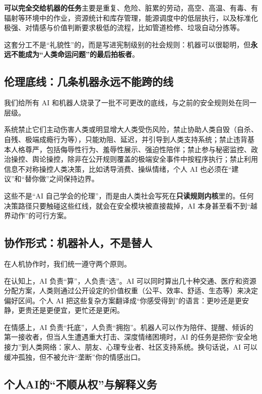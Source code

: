 \textbf{可以完全交给机器的任务}主要是重复、危险、脏累的劳动，高空、高温、有毒、有辐射等环境中的作业，资源统计和库存管理，能源调度中的低层执行，以及标准化极强、对情感与价值判断要求极低的流程，比如管道检修、垃圾自动分拣等。

这套分工不是``礼貌性''的，而是写进宪制级别的社会规则：机器可以很聪明，但\textbf{永远不能成为``人类命运问题''的最后拍板者}。

\subsection{伦理底线：几条机器永远不能跨的线}\label{ux4f26ux7406ux5e95ux7ebfux51e0ux6761ux673aux5668ux6c38ux8fdcux4e0dux80fdux8de8ux7684ux7ebf}

我们给所有 AI 和机器人烧录了一批不可更改的底线，与之前的安全规则处在同一层级。

系统禁止它们主动伤害人类或明显增大人类受伤风险，禁止协助人类自毁（自杀、自残、极端成瘾行为等），只能劝阻、延迟，并引导到人类支持系统；禁止违背基本人格尊严，包括侮辱性行为、羞辱性展示、强迫性陪伴；禁止参与秘密监控、政治操控、舆论操控，除非在公开规则覆盖的极端安全事件中按程序执行；禁止利用信息不对称操控人类决策，比如诱导消费、操纵情绪，个人 AI 也必须在``建议''和``替你做''之间保持边界。

这些不是``AI 自己学会的伦理''，而是由人类社会写死在\textbf{只读规则内核}里的。任何决策路径只要触碰这些红线，就会在安全模块被直接裁掉，AI 本身甚至看不到``越界动作''的可行方案。

\subsection{协作形式：机器补人，不是替人}\label{ux534fux4f5cux5f62ux5f0fux673aux5668ux8865ux4ebaux4e0dux662fux66ffux4eba}

在人机协作时，我们统一遵守两个原则。

在认知上，AI 负责``算''，人负责``选''。AI 可以同时算出几十种交通、医疗和资源分配方案，人类则通过公开设定的价值权重（公平、效率、舒适、生态等）来决定偏好区间。个人 AI 把这些复杂方案翻译成``你感受得到''的语言：更吵还是更安静，更贵还是更便宜，更忙还是更闲。

在情感上，AI 负责``托底''，人负责``拥抱''。机器人可以作为陪伴、提醒、倾诉的第一接收者，但当人生遭遇重大打击、深度情绪困境时，AI 的任务是把你``安全地接力''到人类网络：家人、朋友、心理专业者、社区支持系统。换句话说，AI 可以缓冲孤独，但不被允许``垄断''你的情感出口。

\subsection{个人AI的``不顺从权''与解释义务}\label{ux4e2aux4ebaaiux7684ux4e0dux987aux4eceux6743ux4e0eux89e3ux91caux4e49ux52a1}

